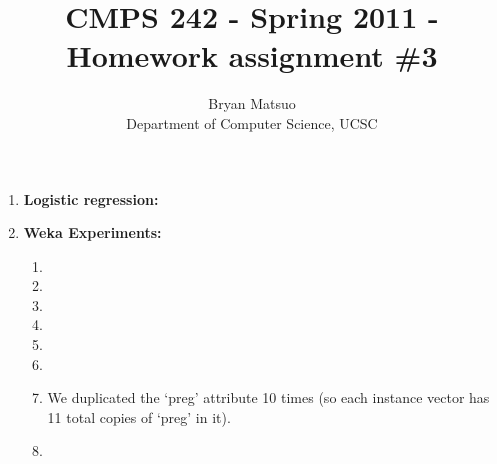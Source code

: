 \documentclass[11pt]{article}
\begin{document}
\title{CMPS 242 - Spring 2011 - Homework assignment \#3}
\author{ {Bryan Matsuo}\\
{Department of Computer Science, UCSC}}
\maketitle

\begin{enumerate}
\item \textbf{Logistic regression:}

\item \textbf{Weka Experiments:}

\begin{enumerate}
\item %

\item %

\item %

\item %

\item %

\item %

\item %

    We duplicated the `preg' attribute 10 times (so each instance vector has
    11 total copies of `preg' in it). 

\item %

\end{enumerate}
\end{enumerate}
\end{document}
